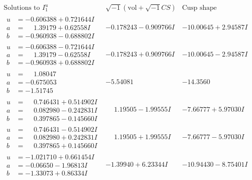 \documentclass[1p]{elsarticle_modified}
\theoremstyle{definition}
\newcommand{\I}{\sqrt{-1}}
\begin{document}
$$\begin{array}{c|c|c}  
\text{Solutions to }I^u_{1}& \I (\text{vol} + \sqrt{-1}CS) & \text{Cusp shape}\\
 \hline 
\begin{aligned}
u &= -0.606388 + 0.721644 I \\
a &= \phantom{-}1.39179 + 0.62558 I \\
b &= -0.960938 - 0.688802 I\end{aligned}
 & -0.178243 - 0.909766 I & -10.00645 + 2.94587 I \\ \hline\begin{aligned}
u &= -0.606388 - 0.721644 I \\
a &= \phantom{-}1.39179 - 0.62558 I \\
b &= -0.960938 + 0.688802 I\end{aligned}
 & -0.178243 + 0.909766 I & -10.00645 - 2.94587 I \\ \hline\begin{aligned}
u &= \phantom{-}1.08047\phantom{ +0.000000I} \\
a &= -0.675053\phantom{ +0.000000I} \\
b &= -1.51745\phantom{ +0.000000I}\end{aligned}
 & -5.54081\phantom{ +0.000000I} & -14.3560\phantom{ +0.000000I} \\ \hline\begin{aligned}
u &= \phantom{-}0.746431 + 0.514902 I \\
a &= \phantom{-}0.082980 - 0.242831 I \\
b &= \phantom{-}0.397865 - 0.145660 I\end{aligned}
 & \phantom{-}1.19505 - 1.99555 I & -7.66777 + 5.97030 I \\ \hline\begin{aligned}
u &= \phantom{-}0.746431 - 0.514902 I \\
a &= \phantom{-}0.082980 + 0.242831 I \\
b &= \phantom{-}0.397865 + 0.145660 I\end{aligned}
 & \phantom{-}1.19505 + 1.99555 I & -7.66777 - 5.97030 I \\ \hline\begin{aligned}
u &= -1.021710 + 0.661454 I \\
a &= -0.06650 - 1.96813 I \\
b &= -1.33073 + 0.86334 I\end{aligned}
 & -1.39940 + 6.23344 I & -10.94430 - 8.75401 I \\ \hline\begin{aligned}

\end{aligned}
\end{array}$$
\end{document}
